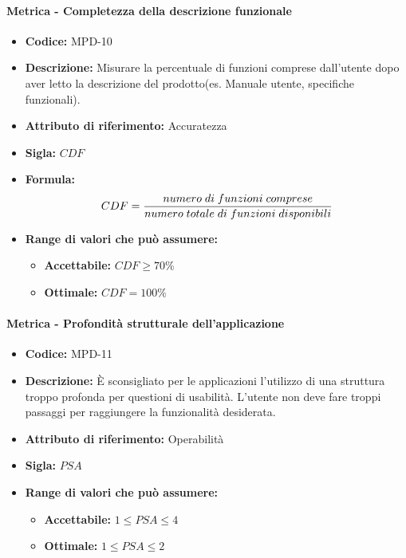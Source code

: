     \paragraph{Metrica - Completezza della descrizione funzionale} 
        \begin{itemize}
            \item   \textbf{Codice:} MPD-10
            \item   \textbf{Descrizione:} Misurare la percentuale di funzioni comprese dall'utente dopo aver letto la descrizione del prodotto(es. Manuale utente, specifiche funzionali).
            \item    \textbf{Attributo di riferimento:} Accuratezza
            \item   \textbf{Sigla:} $CDF$
            \item   \textbf{Formula:} $$CDF = {numero \; di \; funzioni \; comprese \over numero \; totale \; di \; funzioni \; disponibili }$$

            \item \textbf{Range di valori che può assumere:}
            \begin{itemize}
                \item \textbf{Accettabile:} $CDF \geq 70\% $
                \item \textbf{Ottimale:} $CDF = 100\% $
            \end{itemize}
        \end{itemize}

    \paragraph{Metrica - Profondità strutturale dell'applicazione}
    \begin{itemize}
        \item \textbf{Codice:} MPD-11
        \item \textbf{Descrizione:} È sconsigliato per le applicazioni l'utilizzo di una struttura troppo profonda per questioni di usabilità. L'utente non deve fare troppi passaggi per raggiungere la funzionalità desiderata. 
        \item \textbf{Attributo di riferimento:} Operabilità
        \item \textbf{Sigla:} $PSA$
        \item \textbf{Range di valori che può assumere:}
        \begin{itemize}
            \item \textbf{Accettabile:} $1 \leq PSA \leq 4$
            \item \textbf{Ottimale:} $1 \leq PSA \leq 2$
        \end{itemize}
    \end{itemize}

